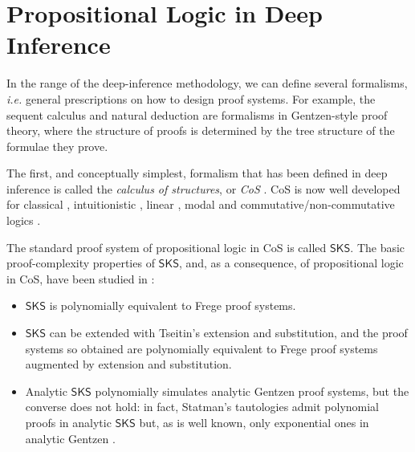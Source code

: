 \section{Propositional Logic in Deep Inference}\label{section:PropositionalLogicInDeepInference}

In the range of the deep-inference methodology, we can define several formalisms, \emph{i.e.} general prescriptions on how to design proof systems. For example, the sequent calculus and natural deduction are formalisms in Gentzen-style proof theory, where the structure of proofs is determined by the tree structure of the formulae they prove.

The first, and conceptually simplest, formalism that has been defined in deep inference is called the \emph{calculus of structures}, or \emph{CoS} \cite{Gugl:06:A-System:kl}. CoS is now well developed for classical \cite{Brun:03:Atomic-C:oz,Brun:06:Cut-Elim:cq,Brun:06:Locality:zh,BrunTiu:01:A-Local-:mz,Brun:06:Deep-Inf:qy}, intuitionistic \cite{Tiu:06:A-Local-:gf}, linear \cite{Stra:02:A-Local-:ul,Stra:03:MELL-in-:oy}, modal \cite{Brun::Deep-Seq:ay,GoreTiu:06:Classica:uq,Stou:06:A-Deep-I:rt} and com\-mu\-ta\-tive/non-commutative logics \cite{Gugl:06:A-System:kl,Tiu:06:A-System:ai,Stra:03:Linear-L:lp,Brus:02:A-Purely:wd,Di-G:04:Structur:wy,GuglStra:01:Non-comm:rp,GuglStra:02:A-Non-co:lq,StraGugl:09:A-System:vn,GuglStra:02:A-Non-co:dq,Kahr:06:Reducing:hc,Kahr:07:System-B:fk}.

\newcommand{\SKS}{\mathsf{SKS}}

The standard proof system of propositional logic in CoS is called $\SKS$. The basic proof-complexity properties of $\SKS$, and, as a consequence, of propositional logic in CoS, have been studied in \cite{BrusGugl:07:On-the-P:fk}:
\begin{itemize}
\item $\SKS$ is polynomially equivalent to Frege proof systems.
\item $\SKS$ can be extended with Tseitin's extension and substitution, and the proof systems so obtained are polynomially equivalent to Frege proof systems augmented by extension and substitution.
\item Analytic $\SKS$ polynomially simulates analytic Gentzen proof systems, but the converse does not hold: in fact, Statman's tautologies admit polynomial proofs in analytic $\SKS$ but, as is well known, only exponential ones in analytic Gentzen \cite{Stat:78:Bounds-f:fj}.
\end{itemize}

